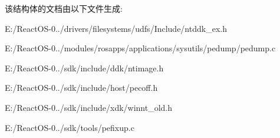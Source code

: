 该结构体的文档由以下文件生成\+:\begin{DoxyCompactItemize}
\item 
E\+:/\+React\+O\+S-\/0../drivers/filesystems/udfs/\+Include/ntddk\+\_\+ex.\+h\item 
E\+:/\+React\+O\+S-\/0../modules/rosapps/applications/sysutils/pedump/pedump.\+c\item 
E\+:/\+React\+O\+S-\/0../sdk/include/ddk/ntimage.\+h\item 
E\+:/\+React\+O\+S-\/0../sdk/include/host/pecoff.\+h\item 
E\+:/\+React\+O\+S-\/0../sdk/include/xdk/winnt\+\_\+old.\+h\item 
E\+:/\+React\+O\+S-\/0../sdk/tools/pefixup.\+c\end{DoxyCompactItemize}
